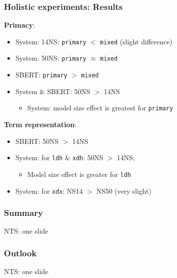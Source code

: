 \documentclass[handout,xcolor={dvipsnames}]{beamer}
\newcommand{\param}[1]{\texttt{#1}}
\begin{document}
\begin{frame}
\frametitle{Holistic experiments: Results}

\vspace{-.5em}

\pause
\textbf{Primacy}:
\begin{itemize}
\pause
\item System: 14NS: \param{primary} $<$ \param{mixed} (slight difference)
\pause
\item System: 50NS: \param{primary} $\approx$ \param{mixed}
\pause
\item SBERT: \param{primary} $>$ \param{mixed}
\pause
\item System \& SBERT: 50NS $>$ 14NS
\begin{itemize}
\pause
\item System: model size effect is greatest for \param{primary}
\end{itemize}
\end{itemize}

\vspace{1em}

\pause
\textbf{Term representation}:
\begin{itemize}
\pause
\item SBERT: 50NS $>$ 14NS
\pause
\item System: for \param{ldh} \& \param{xdh}: 50NS $>$ 14NS;
\begin{itemize}
\pause
\item Model size effect is greater for \param{ldh}
\end{itemize}
\pause
\item System: for \param{xdx}: NS14 $>$ NS50 (very slight)
\end{itemize}

\end{frame}


\begin{frame}
\frametitle{Summary}
NTS: one slide
\end{frame}

\begin{frame}
\frametitle{Outlook}
NTS: one slide
\end{frame}
\end{document}
